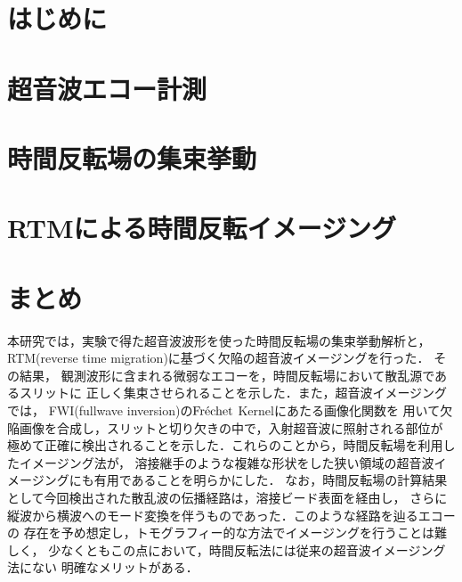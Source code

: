 \documentclass[jscefinal]{jjsce}%
\begin{document}
\section{はじめに}
	
\section{超音波エコー計測}
	
\section{時間反転場の集束挙動}
	
\section{RTMによる時間反転イメージング}
	
\section{まとめ}
本研究では，実験で得た超音波波形を使った時間反転場の集束挙動解析と，
RTM(reverse time migration)に基づく欠陥の超音波イメージングを行った．
その結果，
観測波形に含まれる微弱なエコーを，時間反転場において散乱源であるスリットに
正しく集束させられることを示した．また，超音波イメージングでは，
FWI(fullwave inversion)の${\rm Fr\acute{e}chet}$ Kernelにあたる画像化関数を
用いて欠陥画像を合成し，スリットと切り欠きの中で，入射超音波に照射される部位が
極めて正確に検出されることを示した．これらのことから，時間反転場を利用したイメージング法が，
溶接継手のような複雑な形状をした狭い領域の超音波イメージングにも有用であることを明らかにした．
なお，時間反転場の計算結果として今回検出された散乱波の伝播経路は，溶接ビード表面を経由し，
さらに縦波から横波へのモード変換を伴うものであった．このような経路を辿るエコーの
存在を予め想定し，トモグラフィー的な方法でイメージングを行うことは難しく，
少なくともこの点において，時間反転法には従来の超音波イメージング法にない
明確なメリットがある．
\end{document}
